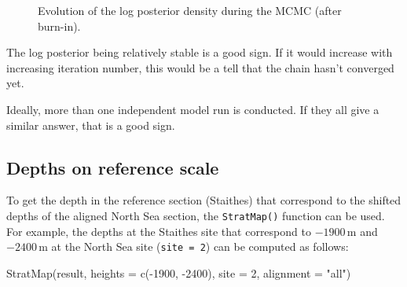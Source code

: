 \documentclass[
  letterpaper,
  DIV=11,
  numbers=noendperiod]{scrartcl}
\newenvironment{Shaded}{\begin{snugshade}}{\end{snugshade}}
\newcommand{\AttributeTok}[1]{\textcolor[rgb]{0.40,0.45,0.13}{#1}}
\newcommand{\DecValTok}[1]{\textcolor[rgb]{0.68,0.00,0.00}{#1}}
\newcommand{\FunctionTok}[1]{\textcolor[rgb]{0.28,0.35,0.67}{#1}}
\newcommand{\NormalTok}[1]{\textcolor[rgb]{0.00,0.23,0.31}{#1}}
\newcommand{\SpecialCharTok}[1]{\textcolor[rgb]{0.37,0.37,0.37}{#1}}
\newcommand{\StringTok}[1]{\textcolor[rgb]{0.13,0.47,0.30}{#1}}
\begin{document}
\begin{figure}[H]


\caption{\label{fig-11}Evolution of the log posterior density during the
MCMC (after burn-in).}

\end{figure}%

The log posterior being relatively stable is a good sign. If it would
increase with increasing iteration number, this would be a tell that the
chain hasn't converged yet.

Ideally, more than one independent model run is conducted. If they all
give a similar answer, that is a good sign.

\subsection{Depths on reference scale}\label{depths-on-reference-scale}

To get the depth in the reference section (Staithes) that correspond to
the shifted depths of the aligned North Sea section, the
\texttt{StratMap()} function can be used. For example, the depths at the
Staithes site that correspond to \(-1900 \, \text{m}\) and
\(-2400 \, \text{m}\) at the North Sea site (\texttt{site\ =\ 2}) can be
computed as follows:

\begin{Shaded}
\begin{Highlighting}[]
\FunctionTok{StratMap}\NormalTok{(result, }\AttributeTok{heights =} \FunctionTok{c}\NormalTok{(}\SpecialCharTok{{-}}\DecValTok{1900}\NormalTok{, }\SpecialCharTok{{-}}\DecValTok{2400}\NormalTok{), }\AttributeTok{site =} \DecValTok{2}\NormalTok{, }\AttributeTok{alignment =} \StringTok{"all"}\NormalTok{)}
\end{Highlighting}
\end{Shaded}
\end{document}
